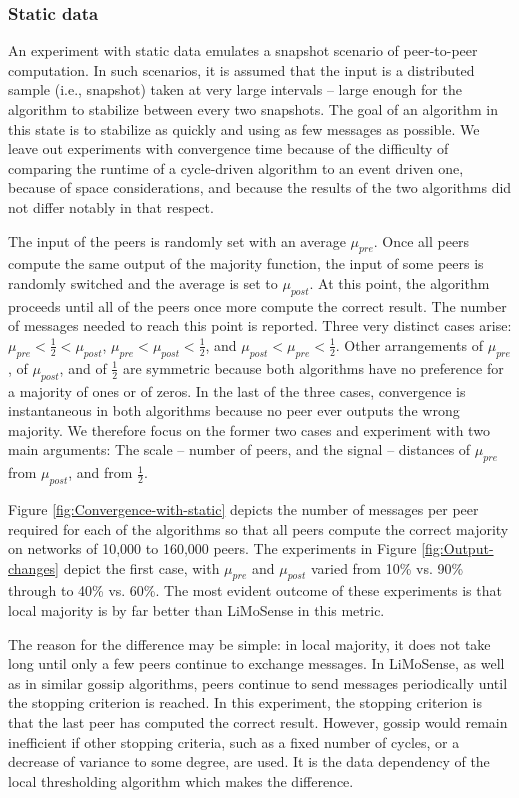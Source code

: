 \documentclass[12pt,english,journal]{elsarticle}
\numberwithin{equation}{section}
\numberwithin{figure}{section}
\theoremstyle{plain}
\theoremstyle{plain}
\begin{document}
\subsubsection{Static data}

An experiment with static data emulates a snapshot scenario of peer-to-peer
computation. In such scenarios, it is assumed that the input is a
distributed sample (i.e., snapshot) taken at very large intervals
-- large enough for the algorithm to stabilize between every two snapshots.
The goal of an algorithm in this state is to stabilize as quickly
and using as few messages as possible. We leave out experiments with
convergence time because of the difficulty of comparing the runtime
of a cycle-driven algorithm to an event driven one, because of space
considerations, and because the results of the two algorithms did
not differ notably in that respect.

The input of the peers is randomly set with an average $\mu_{pre}$.
Once all peers compute the same output of the majority function, the
input of some peers is randomly switched and the average is set to
$\mu_{post}$. At this point, the algorithm proceeds until all of
the peers once more compute the correct result. The number of messages
needed to reach this point is reported. Three very distinct cases
arise: $\mu_{pre}<\frac{1}{2}<\mu_{post}$, $\mu_{pre}<\mu_{post}<\frac{1}{2}$,
and $\mu_{post}<\mu_{pre}<\frac{1}{2}$. Other arrangements of $\mu_{pre}$,
of $\mu_{post}$, and of $\frac{1}{2}$ are symmetric because both
algorithms have no preference for a majority of ones or of zeros.
In the last of the three cases, convergence is instantaneous in both
algorithms because no peer ever outputs the wrong majority. We therefore
focus on the former two cases and experiment with two main arguments:
The scale -- number of peers, and the signal -- distances of $\mu_{pre}$
from $\mu_{post}$, and from $\frac{1}{2}$.

Figure \ref{fig:Convergence-with-static} depicts the number of messages
per peer required for each of the algorithms so that all peers compute
the correct majority on networks of 10,000 to 160,000 peers. The experiments
in Figure \ref{fig:Output-changes} depict the first case, with $\mu_{pre}$
and $\mu_{post}$ varied from 10\% vs. 90\% through to 40\% vs. 60\%.
The most evident outcome of these experiments is that local majority
is by far better than LiMoSense in this metric. 

The reason for the difference may be simple: in local majority, it
does not take long until only a few peers continue to exchange messages.
In LiMoSense, as well as in similar gossip algorithms, peers continue
to send messages periodically until the stopping criterion is reached.
In this experiment, the stopping criterion is that the last peer has
computed the correct result. However, gossip would remain inefficient
if other stopping criteria, such as a fixed number of cycles, or a
decrease of variance to some degree, are used. It is the data dependency
of the local thresholding algorithm which makes the difference. 
\end{document}
